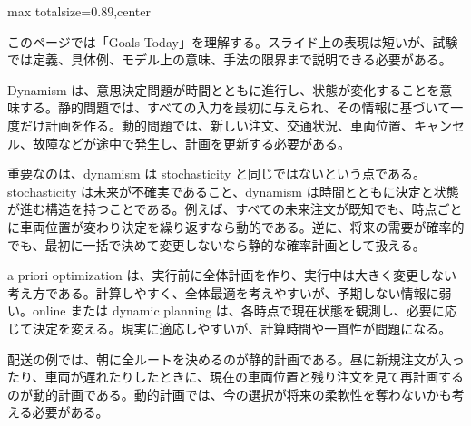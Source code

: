 \begin{minipage}[t]{0.58\textwidth}
\begin{adjustbox}{max totalsize={\textwidth}{0.89\textheight},center}
\begin{minipage}{\textwidth}\scriptsize
{}このページでは「Goals Today」を理解する。スライド上の表現は短いが、試験では定義、具体例、モデル上の意味、手法の限界まで説明できる必要がある。\par
Dynamism は、意思決定問題が時間とともに進行し、状態が変化することを意味する。静的問題では、すべての入力を最初に与えられ、その情報に基づいて一度だけ計画を作る。動的問題では、新しい注文、交通状況、車両位置、キャンセル、故障などが途中で発生し、計画を更新する必要がある。\par
重要なのは、dynamism は stochasticity と同じではないという点である。stochasticity は未来が不確実であること、dynamism は時間とともに決定と状態が進む構造を持つことである。例えば、すべての未来注文が既知でも、時点ごとに車両位置が変わり決定を繰り返すなら動的である。逆に、将来の需要が確率的でも、最初に一括で決めて変更しないなら静的な確率計画として扱える。\par
a priori optimization は、実行前に全体計画を作り、実行中は大きく変更しない考え方である。計算しやすく、全体最適を考えやすいが、予期しない情報に弱い。online または dynamic planning は、各時点で現在状態を観測し、必要に応じて決定を変える。現実に適応しやすいが、計算時間や一貫性が問題になる。\par
配送の例では、朝に全ルートを決めるのが静的計画である。昼に新規注文が入ったり、車両が遅れたりしたときに、現在の車両位置と残り注文を見て再計画するのが動的計画である。動的計画では、今の選択が将来の柔軟性を奪わないかも考える必要がある。\par

\end{minipage}
\end{adjustbox}
\end{minipage}
